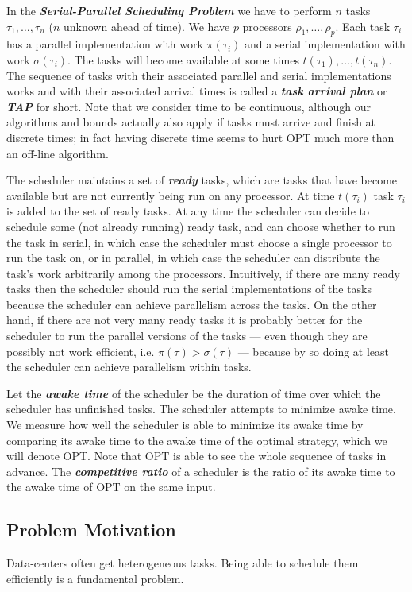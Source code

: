 \documentclass[twocolumn]{article}[10pt]
\newcommand{\defn}[1]{{\textit{\textbf{\boldmath #1}}}\xspace}
\begin{document}
In the \defn{Serial-Parallel Scheduling Problem} we have to
perform $n$ tasks $\tau_1, \ldots, \tau_n$ ($n$ unknown ahead of
time). We have $p$ processors $\rho_1, \ldots, \rho_p$. Each task
$\tau_i$ has a parallel implementation with work $\pi(\tau_i)$ and a
serial implementation with work $\sigma(\tau_i)$. The tasks will become
available at some times $t(\tau_1), \ldots, t(\tau_n)$. 
The sequence of tasks with their associated parallel and serial
implementations works and with their associated arrival times is
called a \defn{task arrival plan} or \defn{TAP} for short.
Note that we consider time to be continuous, although our
algorithms and bounds actually also apply if tasks must arrive
and finish at discrete times; in fact having discrete time seems
to hurt OPT much more than an off-line algorithm.

The scheduler maintains a set of \defn{ready} tasks, which are
tasks that have become available but are not currently being run
on any processor. At time $t(\tau_i)$ task $\tau_i$ is added to
the set of ready tasks. At any time the scheduler can decide to
schedule some (not already running) ready task, and can choose
whether to run the task in serial, in which case the scheduler
must choose a single processor to run the task on, or in
parallel, in which case the scheduler can distribute the task's
work arbitrarily among the processors. Intuitively, if there are
many ready tasks then the scheduler should run the serial
implementations of the tasks because the scheduler can achieve
parallelism across the tasks. On the other hand, if there are not
very many ready tasks it is probably better for the scheduler to
run the parallel versions of the tasks --- even though they are
possibly not work efficient, i.e. $\pi(\tau) > \sigma(\tau)$ ---
because by so doing at least the scheduler can achieve
parallelism within tasks.

Let the \defn{awake time} of the scheduler be the duration of
time over which the scheduler has unfinished tasks.
The scheduler attempts to minimize awake time.
We measure how well the scheduler is able to minimize its awake
time by comparing its awake time to the awake time of the optimal
strategy, which we will denote OPT. Note that OPT is able to see
the whole sequence of tasks in advance.
The \defn{competitive ratio} of a scheduler is the ratio
of its awake time to the awake time of OPT on the same input.

\subsection{Problem Motivation}
Data-centers often get heterogeneous tasks. Being able to schedule
them efficiently is a fundamental problem. 
\end{document}
